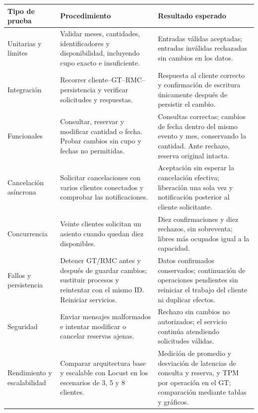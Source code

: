 \documentclass[10pt, a4paper]{article}
\begin{document}
    \begin{table}[H]
        \centering
        \footnotesize
        \renewcommand{\arraystretch}{1.15}
        \begin{tabular}{@{}p{}p{}p{}@{}}
            \toprule
            \textbf{Tipo de prueba} & \textbf{Procedimiento} & \textbf{Resultado esperado} \\
            \midrule
            Unitarias y límites & Validar meses, cantidades, identificadores y disponibilidad, incluyendo cupo exacto e insuficiente. & Entradas válidas aceptadas; entradas inválidas rechazadas sin cambios en los datos. \\
            Integración & Recorrer cliente--GT--RMC--persistencia y verificar solicitudes y respuestas. & Respuesta al cliente correcto y confirmación de escritura únicamente después de persistir el cambio. \\
            Funcionales & Consultar, reservar y modificar cantidad o fecha. Probar cambios sin cupo y fechas no permitidas. & Consultas correctas; cambios de fecha dentro del mismo evento y mes, conservando la cantidad. Ante rechazo, reserva original intacta. \\
            Cancelación asíncrona & Solicitar cancelaciones con varios clientes conectados y comprobar las notificaciones. & Aceptación sin esperar la cancelación efectiva; liberación una sola vez y notificación posterior al cliente solicitante. \\
            Concurrencia & Veinte clientes solicitan un asiento cuando quedan diez disponibles. & Diez confirmaciones y diez rechazos, sin sobreventa; libres más ocupados igual a la capacidad. \\
            Fallos y persistencia & Detener GT/RMC antes y después de guardar cambios; sustituir procesos y reintentar con el mismo ID. Reiniciar servicios. & Datos confirmados conservados; continuación de operaciones pendientes sin reiniciar el trabajo del cliente ni duplicar efectos. \\
            Seguridad & Enviar mensajes malformados e intentar modificar o cancelar reservas ajenas. & Rechazo sin cambios no autorizados; el servicio continúa atendiendo solicitudes válidas. \\
            Rendimiento y escalabilidad & Comparar arquitectura base y escalable con Locust en los escenarios de 3, 5 y 8 clientes. & Medición de promedio y desviación de latencias de consulta y reserva, y TPM por operación en el GT; comparación mediante tablas y gráficos. \\

\end{tabular}
\end{table}
\end{document}
